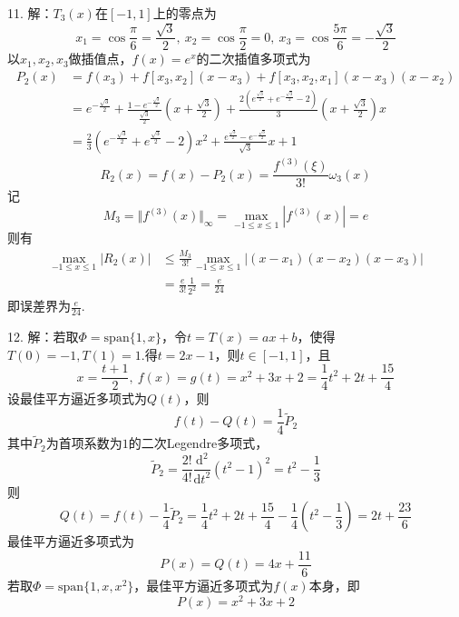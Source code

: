 \documentclass[12pt, a4paper]{article}
\theoremstyle{margin}
\begin{document}
11. 解：$T_3(x)$在$[-1,1]$上的零点为
\[x_1=\cos\frac{\pi}{6}=\frac{\sqrt{3}}{2},\ x_2=\cos\frac{\pi}{2}=0,\ x_3=\cos\frac{5\pi}{6}=-\frac{\sqrt{3}}{2}\]
以$x_1,x_2,x_3$做插值点，$f(x)=e^x$的二次插值多项式为
\[\begin{split}
P_2(x)&=f(x_3)+f[x_3,x_2](x-x_3)+f[x_3,x_2,x_1](x-x_3)(x-x_2) \\
&=e^{-\frac{\sqrt{3}}{2}}+\frac{1-e^{-\frac{\sqrt{3}}{2}}}{\frac{\sqrt{3}}{2}}(x+\frac{\sqrt{3}}{2})+\frac{2(e^{\frac{\sqrt{3}}{2}}+e^{-\frac{\sqrt{3}}{2}}-2)}{3}(x+\frac{\sqrt{3}}{2})x \\
&=\frac{2}{3}(e^{-\frac{\sqrt{3}}{2}}+e^{\frac{\sqrt{3}}{2}}-2)x^2+\frac{e^{\frac{\sqrt{3}}{2}}-e^{-\frac{\sqrt{3}}{2}}}{\sqrt{3}}x+1
\end{split}\]
\[R_2(x)=f(x)-P_2(x)=\frac{f^{(3)}(\xi)}{3!}\omega_3(x)\]
记
\[M_3=\Vert f^{(3)}(x) \Vert _\infty=\max_{-1\le x \le 1}|f^{(3)}(x)|=e\]
则有
\[\begin{split}
\max_{-1\le x\le1}|R_2(x)|&\le \frac{M_3}{3!}\max_{-1\le x \le 1}|(x-x_1)(x-x_2)(x-x_3)| \\
&=\frac{e}{3!}\frac{1}{2^2}=\frac{e}{24}
\end{split}\]
即误差界为$\frac{e}{24}$.
\newline

12. 解：若取$\Phi=\mathrm{span}\{1,x\}$，令$t=T(x)=ax+b$，使得$T(0)=-1,T(1)=1$.得$t=2x-1$，则$t\in[-1,1]$，且
\[x=\frac{t+1}{2},\ f(x)=g(t)=x^2+3x+2=\frac{1}{4}t^2+2t+\frac{15}{4}\]
设最佳平方逼近多项式为$Q(t)$，则
\[f(t)-Q(t)=\frac{1}{4}\widetilde{P}_2\]
其中$\widetilde{P}_2$为首项系数为$1$的二次Legendre多项式，
\[\widetilde{P}_2=\frac{2!}{4!}\frac{\mathrm{d}^2}{\mathrm{d}t^2}(t^2-1)^2=t^2-\frac{1}{3}\]
则
\[Q(t)=f(t)-\frac{1}{4}\widetilde{P}_2=\frac{1}{4}t^2+2t+\frac{15}{4}-\frac{1}{4}(t^2-\frac{1}{3})=2t+\frac{23}{6}\]
最佳平方逼近多项式为
\[P(x)=Q(t)=4x+\frac{11}{6}\]
若取$\Phi=\mathrm{span}\{1,x,x^2\}$，最佳平方逼近多项式为$f(x)$本身，即
\[P(x)=x^2+3x+2\]
\end{document}
